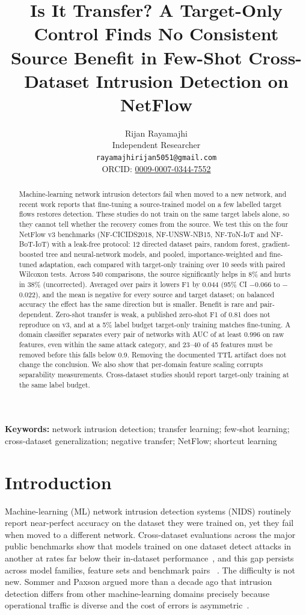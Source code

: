 \documentclass[11pt]{article}
\title{Is It Transfer? A Target-Only Control Finds No Consistent Source Benefit in Few-Shot Cross-Dataset Intrusion Detection on NetFlow}
\author{Rijan Rayamajhi\\ Independent Researcher\\ \texttt{rayamajhirijan5051@gmail.com}\\ ORCID: \href{https://orcid.org/0009-0007-0344-7552}{0009-0007-0344-7552}}
\date{}
\begin{document}
\maketitle

\begin{abstract}
Machine-learning network intrusion detectors fail when moved to a new network, and recent work reports that fine-tuning a source-trained model on a few labelled target flows restores detection. These studies do not train on the same target labels alone, so they cannot tell whether the recovery comes from the source. We test this on the four NetFlow v3 benchmarks (NF-CICIDS2018, NF-UNSW-NB15, NF-ToN-IoT and NF-BoT-IoT) with a leak-free protocol: 12 directed dataset pairs, random forest, gradient-boosted tree and neural-network models, and pooled, importance-weighted and fine-tuned adaptation, each compared with target-only training over 10 seeds with paired Wilcoxon tests. Across 540 comparisons, the source significantly helps in 8\% and hurts in 38\% (uncorrected). Averaged over pairs it lowers F1 by 0.044 (95\% CI $-$0.066 to $-$0.022), and the mean is negative for every source and target dataset; on balanced accuracy the effect has the same direction but is smaller. Benefit is rare and pair-dependent. Zero-shot transfer is weak, a published zero-shot F1 of 0.81 does not reproduce on v3, and at a 5\% label budget target-only training matches fine-tuning. A domain classifier separates every pair of networks with AUC of at least 0.996 on raw features, even within the same attack category, and 23--40 of 45 features must be removed before this falls below 0.9. Removing the documented TTL artifact does not change the conclusion. We also show that per-domain feature scaling corrupts separability measurements. Cross-dataset studies should report target-only training at the same label budget.
\end{abstract}

\noindent\textbf{Keywords:} network intrusion detection; transfer learning; few-shot learning; cross-dataset generalization; negative transfer; NetFlow; shortcut learning

\section{Introduction}

Machine-learning (ML) network intrusion detection systems (NIDS) routinely report near-perfect accuracy on the dataset they were trained on, yet they fail when moved to a different network. Cross-dataset evaluations across the major public benchmarks show that models trained on one dataset detect attacks in another at rates far below their in-dataset performance~\cite{cantone2024cross}, and this gap persists across model families, feature sets and benchmark pairs ~\cite{apruzzese2022cross,dhooge2020inter,layeghy2023explainable}. The difficulty is not new. Sommer and Paxson argued more than a decade ago that intrusion detection differs from other machine-learning domains precisely because operational traffic is diverse and the cost of errors is asymmetric~\cite{sommer2010outside}.
\end{document}
